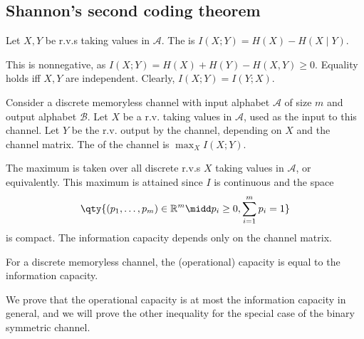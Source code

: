 \subsection{Shannon's second coding theorem}
\begin{definition}
    Let $X, Y$ be r.v.s taking values in $\mathcal A$.
    The  is $I(X;Y) = H(X) - H(X \mid Y)$.
\end{definition}
This is nonnegative, as $I(X;Y) = H(X) + H(Y) - H(X,Y) \geq 0$.
Equality holds iff $X, Y$ are independent.
Clearly, $I(X;Y) = I(Y;X)$.
\begin{definition}
    Consider a discrete memoryless channel with input alphabet $\mathcal A$ of size $m$ and output alphabet $\mathcal B$.
    Let $X$ be a r.v. taking values in $\mathcal A$, used as the input to this channel.
    Let $Y$ be the r.v. output by the channel, depending on $X$ and the channel matrix.
    The  of the channel is $\max_{X} I(X;Y)$.
\end{definition}
The maximum is taken over all discrete r.v.s $X$ taking values in $\mathcal A$, or equivalently.
This maximum is attained since $I$ is continuous and the space
\begin{align*}
        \qty{(p_1, \dots, p_m) \in \mathbb R^m \midd p_i \geq 0, \sum_{i=1}^m p_i = 1}
    \end{align*}
is compact.
The information capacity depends only on the channel matrix.
\begin{theorem}
    For a discrete memoryless channel, the (operational) capacity is equal to the information capacity.
\end{theorem}
We prove that the operational capacity is at most the information capacity in general, and we will prove the other inequality for the special case of the binary symmetric channel.
